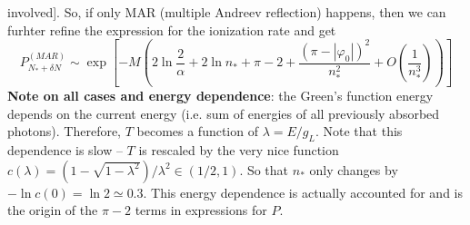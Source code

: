\begin{enumerate}
	involved{]}. So, if only MAR (multiple Andreev reflection) happens,
	then we can furhter refine the expression for the ionization rate
	and get
	\begin{equation}
	P_{N_{*}+\delta N}^{(MAR)}\sim\exp\left[-M\left(2\ln\frac{2}{\alpha}+2\ln n_{*}+\pi-2+\frac{(\pi-|\varphi_{0}|)^{2}}{n_{*}^{2}}+O\left(\frac{1}{n_{*}^{3}}\right)\right)\right]
	\end{equation}
	\linebreak{}
	\textbf{Note on all cases and energy dependence}: the Green's function
	energy depends on the current energy (i.e. sum of energies of all
	previously absorbed photons). Therefore, $T$ becomes a function of
	$\lambda=E/g_{L}$. Note that this dependence is slow -- $T$ is
	rescaled by the very nice function $c(\lambda)=(1-\sqrt{1-\lambda^{2}})/\lambda^{2}\in(1/2,1)$.
	So that $n_{*}$ only changes by $-\ln c(0)=\ln2\simeq0.3$. This
	energy dependence is actually accounted for and is the origin of the
	$\pi-2$ terms in expressions for $P$.
\end{enumerate}
